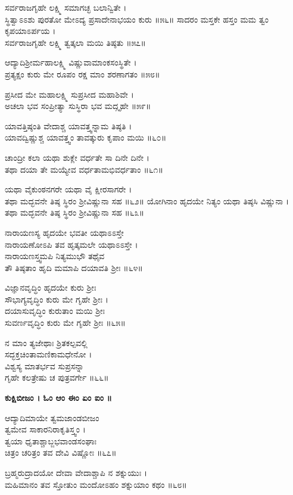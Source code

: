 ಸರ್ವರಾಜಗೃಹೇ ಲಕ್ಷ್ಮಿ ಸಮಾಗಚ್ಛ ಬಲಾನ್ವಿತೇ ।\\
ಸ್ಥಿತ್ವಾಽಽಶು ಪುರತೋ ಮೇಽದ್ಯ ಪ್ರಸಾದೇನಾಭಯಂ ಕುರು ॥೫೬॥
\newpage
	ಸಾದರಂ ಮಸ್ತಕೇ ಹಸ್ತಂ ಮಮ ತ್ವಂ ಕೃಪಯಾಽರ್ಪಯ ।\\
	ಸರ್ವರಾಜಗೃಹೇ ಲಕ್ಷ್ಮಿ ತ್ವತ್ಕಲಾ ಮಯಿ ತಿಷ್ಠತು ॥೫೭॥

ಆದ್ಯಾದಿಶ್ರೀರ್ಮಹಾಲಕ್ಷ್ಮಿ ವಿಷ್ಣುವಾಮಾಂಕಸಂಸ್ಥಿತೇ ।\\
ಪ್ರತ್ಯಕ್ಷಂ ಕುರು ಮೇ ರೂಪಂ ರಕ್ಷ ಮಾಂ ಶರಣಾಗತಂ ॥೫೮॥

	ಪ್ರಸೀದ ಮೇ ಮಹಾಲಕ್ಷ್ಮಿ ಸುಪ್ರಸೀದ ಮಹಾಶಿವೇ ।\\
	ಅಚಲಾ ಭವ ಸಂಪ್ರೀತ್ಯಾ ಸುಸ್ಥಿರಾ ಭವ ಮದ್ಗೃಹೇ ॥೫೯॥

ಯಾವತ್ತಿಷ್ಠಂತಿ ವೇದಾಶ್ಚ ಯಾವತ್ತ್ವನ್ನಾಮ ತಿಷ್ಠತಿ ।\\
ಯಾವದ್ವಿಷ್ಣುಶ್ಚ ಯಾವತ್ತ್ವಂ ತಾವತ್ಕುರು ಕೃಪಾಂ ಮಯಿ ॥೬೦॥

	ಚಾಂದ್ರೀ ಕಲಾ ಯಥಾ ಶುಕ್ಲೇ ವರ್ಧತೇ ಸಾ ದಿನೇ ದಿನೇ ।\\
	ತಥಾ ದಯಾ ತೇ ಮಯ್ಯೇವ ವರ್ಧತಾಮಭಿವರ್ಧತಾಂ ॥೬೧॥

ಯಥಾ ವೈಕುಂಠನಗರೇ ಯಥಾ ವೈ ಕ್ಷೀರಸಾಗರೇ ।\\
ತಥಾ ಮದ್ಭವನೇ ತಿಷ್ಠ ಸ್ಥಿರಂ ಶ್ರೀವಿಷ್ಣುನಾ ಸಹ ॥೬೨॥
\newpage
	ಯೋಗಿನಾಂ ಹೃದಯೇ ನಿತ್ಯಂ ಯಥಾ ತಿಷ್ಠಸಿ ವಿಷ್ಣುನಾ ।\\
	ತಥಾ ಮದ್ಭವನೇ ತಿಷ್ಠ ಸ್ಥಿರಂ ಶ್ರೀವಿಷ್ಣುನಾ ಸಹ ॥೬೩॥

ನಾರಾಯಣಸ್ಯ ಹೃದಯೇ ಭವತೀ ಯಥಾಽಽಸ್ತೇ\\ ನಾರಾಯಣೋಽಪಿ ತವ ಹೃತ್ಕಮಲೇ ಯಥಾಽಽಸ್ತೇ ।\\
ನಾರಾಯಣಸ್ತ್ವಮಪಿ ನಿತ್ಯಮುಭೌ ತಥೈವ \\ತೌ ತಿಷ್ಠತಾಂ ಹೃದಿ ಮಮಾಪಿ ದಯಾವತಿ ಶ್ರೀಃ ॥೬೪॥

	ವಿಜ್ಞಾನವೃದ್ಧಿಂ ಹೃದಯೇ ಕುರು ಶ್ರೀಃ \\ಸೌಭಾಗ್ಯವೃದ್ಧಿಂ ಕುರು ಮೇ ಗೃಹೇ ಶ್ರೀಃ ।\\
	ದಯಾಸುವೃದ್ಧಿಂ ಕುರುತಾಂ ಮಯಿ ಶ್ರೀಃ \\ಸುವರ್ಣವೃದ್ಧಿಂ ಕುರು ಮೇ ಗೃಹೇ ಶ್ರೀಃ ॥೬೫॥

ನ ಮಾಂ ತ್ಯಜೇಥಾಃ ಶ್ರಿತಕಲ್ಪವಲ್ಲಿ \\ಸದ್ಭಕ್ತಚಿಂತಾಮಣಿಕಾಮಧೇನೋ ।\\
ವಿಶ್ವಸ್ಯ ಮಾತರ್ಭವ ಸುಪ್ರಸನ್ನಾ \\ಗೃಹೇ ಕಲತ್ರೇಷು ಚ ಪುತ್ರವರ್ಗೇ ॥೬೬॥

{\bfseries ಕುಕ್ಷಿಬೀಜಂ । ಓಂ ಆಂ ಈಂ ಏಂ ಐಂ ॥}

	ಆದ್ಯಾದಿಮಾಯೇ ತ್ವಮಜಾಂಡಬೀಜಂ\\ ತ್ವಮೇವ ಸಾಕಾರನಿರಾಕೃತಿಸ್ತ್ವಂ ।\\
	ತ್ವಯಾ ಧೃತಾಶ್ಚಾಬ್ಜಭವಾಂಡಸಂಘಾಃ\\ಚಿತ್ರಂ ಚರಿತ್ರಂ ತವ ದೇವಿ ವಿಷ್ಣೋಃ ॥೬೭॥

ಬ್ರಹ್ಮರುದ್ರಾದಯೋ ದೇವಾ ವೇದಾಶ್ಚಾಪಿ ನ ಶಕ್ನುಯುಃ ।\\
ಮಹಿಮಾನಂ ತವ ಸ್ತೋತುಂ ಮಂದೋಽಹಂ ಶಕ್ನುಯಾಂ ಕಥಂ ॥೬೮॥

